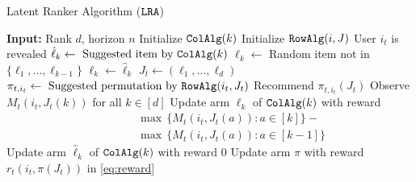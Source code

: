 

\begin{algorithm}[!th]
  \caption{Latent Ranker Algorithm (${\tt LRA}$)}
  \label{alg:latent ranker}
  \begin{algorithmic}[1]
    \STATE \textbf{Input:} Rank $d$, horizon $n$
      \STATE Initialize ${\tt ColAlg}(k)$
    \ENDFOR
      \STATE Initialize ${\tt RowAlg}(i, J)$
    \ENDFOR
    \STATE
      \STATE User $i_t$ is revealed
        \STATE $\hat{\ell}_k \gets \text{ Suggested item by } {\tt ColAlg}(k)$
          \STATE $\ell_k \gets$ Random item not in $\{\ell_1, \dots, \ell_{k - 1}\}$
        \ELSE
          \STATE $\ell_k \gets \hat{\ell}_k$
        \ENDIF
      \ENDFOR
      \STATE $J_t \gets (\ell_1, \dots, \ell_d)$
      \STATE $\pi_{t, i_t} \gets \text{ Suggested permutation by } {\tt RowAlg}(i_t, J_t)$
      \STATE Recommend $\pi_{t, i_t}(J_t)$
      \STATE Observe $M_t(i_t, J_t(k))$ for all $k \in [d]$
          \STATE Update arm $\ell_k$ of ${\tt ColAlg}(k)$ with reward 
          \begin{align*}
            \qquad \quad & \max \, \{M_t(i_t, J_t(a)): a \in [k]\} - {} \\
            & \max \, \{M_t(i_t, J_t(a)): a \in [k - 1]\}
          \end{align*}
        \ELSE
          \STATE Update arm $\hat{\ell}_k$ of ${\tt ColAlg}(k)$ with reward $0$
        \ENDIF
      \ENDFOR
        \STATE Update arm $\pi$ with reward $r_t(i_t, \pi(J_t))$ in \eqref{eq:reward}
      \ENDFOR
    \ENDFOR
  \end{algorithmic}
\end{algorithm}


